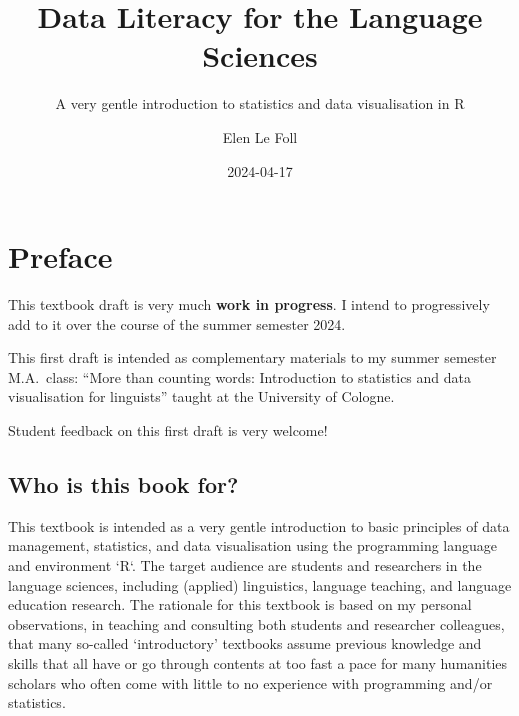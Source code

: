 \documentclass[
  letterpaper,
  DIV=11,
  numbers=noendperiod]{scrreprt}
\title{Data Literacy for the Language Sciences}
\subtitle{A very gentle introduction to statistics and data
visualisation in R}
\author{Elen Le Foll}
\date{2024-04-17}
\renewcommand*\contentsname{Table of contents}
\newcommand\contentsname{Table of contents}
\begin{document}
\maketitle

\renewcommand*\contentsname{Table of contents}
{
\hypersetup{linkcolor=}
\setcounter{tocdepth}{2}
\tableofcontents
}

\chapter*{Preface}\label{preface}


\begin{tcolorbox}[enhanced jigsaw, colbacktitle=quarto-callout-warning-color!10!white, rightrule=.15mm, breakable, toprule=.15mm, toptitle=1mm, colframe=quarto-callout-warning-color-frame, bottomrule=.15mm, coltitle=black, opacityback=0, titlerule=0mm, opacitybacktitle=0.6, title=\textcolor{quarto-callout-warning-color}{\faExclamationTriangle}\hspace{0.5em}{Warning}, left=2mm, arc=.35mm, leftrule=.75mm, bottomtitle=1mm, colback=white]

This textbook draft is very much \textbf{work in progress}. I intend to
progressively add to it over the course of the summer semester 2024.

This first draft is intended as complementary materials to my summer
semester M.A.~class: ``More than counting words: Introduction to
statistics and data visualisation for linguists'' taught at the
University of Cologne.

Student feedback on this first draft is very welcome!

\end{tcolorbox}

\section*{Who is this book for?}\label{who-is-this-book-for}


This textbook is intended as a very gentle introduction to basic
principles of data management, statistics, and data visualisation using
the programming language and environment `R`. The target audience are
students and researchers in the language sciences, including (applied)
linguistics, language teaching, and language education research. The
rationale for this textbook is based on my personal observations, in
teaching and consulting both students and researcher colleagues, that
many so-called `introductory' textbooks assume previous knowledge and
skills that all have or go through contents at too fast a pace for many
humanities scholars who often come with little to no experience with
programming and/or statistics.
\end{document}
